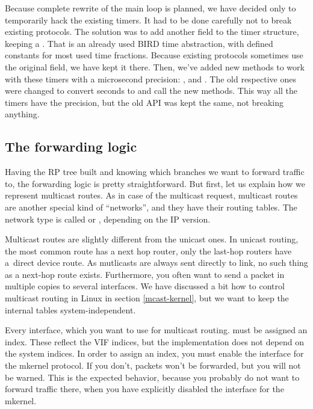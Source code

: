 Because complete rewrite of the main loop is planned, we have decided only to
temporarily hack the existing timers. It had to be done carefully not to break
existing protocols. The solution was to add another field to the timer
structure, keeping a . That is an already used BIRD time abstraction, with
defined constants for most used time fractions. Because existing protocols
sometimes use the original field, we have kept it there. Then, we've added new
methods to work with these timers with a microsecond precision:
,  and
. The old respective ones were changed
to convert seconds to  and call the new methods. This way all the timers
have the  precision, but the old API was kept the same, not breaking
anything.

\subsection{The forwarding logic}
Having the RP tree built and knowing which branches we want to forward traffic
to, the forwarding logic is pretty straightforward. But first, let us explain
how we represent multicast routes. As in case of the multicast request,
multicast routes are another special kind of ``networks'', and they have their
routing tables. The network type is called  or ,
depending on the IP version.

Multicast routes are slightly different from the unicast ones. In unicast routing,
the most common route has a next hop router, only the last-hop routers have
a~direct device route. As mutlicasts are always sent directly to link, no such
thing as a next-hop route exists. Furthermore, you often want to send a packet in
multiple copies to several interfaces. We have discussed a bit how to control
multicast routing in Linux in section \ref{mcast-kernel}, but we want to keep
the internal tables system-independent.

Every interface, which you want to use for multicast routing. must be assigned
an index. These reflect the VIF indices, but the implementation does not depend
on the system indices. In order to assign an index, you must enable the
interface for the mkernel protocol. If you don't, packets won't be
forwarded, but you will not be warned. This is the expected behavior, because
you probably do not want to forward traffic there, when you have explicitly
disabled the interface for the mkernel.

